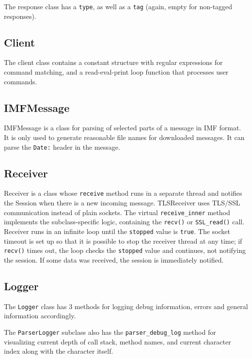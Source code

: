 \documentclass[a4]{report}
\begin{document}
The response class has a \texttt{type}, as well as a \texttt{tag} (again, empty for non-tagged responses).

\subsection{Client}

The client class contains a constant structure with regular expressions for command matching, and a read-eval-print loop function that processes user commands.

\subsection{IMFMessage}

IMFMessage is a class for parsing of selected parts of a message in IMF format\cite{rfc5322}. It is only used to generate reasonable file names for downloaded messages. It can parse the \texttt{Date:} header in the message.

\subsection{Receiver}

Receiver is a class whose \texttt{receive} method runs in a separate thread and notifies the Session when there is a new incoming message. TLSReceiver uses TLS/SSL communication instead of plain sockets. The virtual \texttt{receive\_inner} method implements the subclass-specific logic, containing the \texttt{recv()} or \texttt{SSL\_read()} call. Receiver runs in an infinite loop until the \texttt{stopped} value is \texttt{true}. The socket timeout is set up so that it is possible to stop the receiver thread at any time; if \texttt{recv()} times out, the loop checks the \texttt{stopped} value and continues, not notifying the session. If some data was received, the session is immediately notified.

\subsection{Logger}

The \texttt{Logger} class has 3 methods for logging debug information, errors and general information accordingly.

The \texttt{ParserLogger} subclass also has the \texttt{parser\_debug\_log} method for visualizing current depth of call stack, method names, and current character index along with the character itself.
\end{document}
